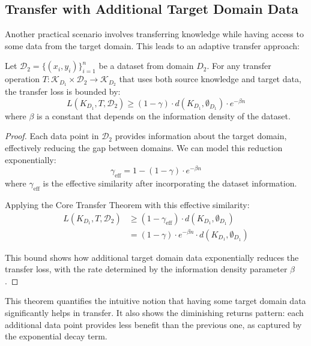 \subsection{Transfer with Additional Target Domain Data}

Another practical scenario involves transferring knowledge while having access to some data from the target domain. This leads to an adaptive transfer approach:

\begin{theorem}
Let $\mathcal{D}_2 = \{(x_i, y_i)\}_{i=1}^n$ be a dataset from domain $D_2$. For any transfer operation $T: \mathcal{K}_{D_1} \times \mathcal{D}_2 \to \mathcal{K}_{D_2}$ that uses both source knowledge and target data, the transfer loss is bounded by:
\begin{equation}
L(K_{D_1}, T, \mathcal{D}_2) \geq (1 - \gamma) \cdot d(K_{D_1}, \emptyset_{D_1}) \cdot e^{-\beta n}
\end{equation}
where $\beta$ is a constant that depends on the information density of the dataset.
\end{theorem}

\begin{proof}
Each data point in $\mathcal{D}_2$ provides information about the target domain, effectively reducing the gap between domains. We can model this reduction exponentially:
\begin{equation}
\gamma_{\text{eff}} = 1 - (1 - \gamma) \cdot e^{-\beta n}
\end{equation}
where $\gamma_{\text{eff}}$ is the effective similarity after incorporating the dataset information.

Applying the Core Transfer Theorem with this effective similarity:
\begin{align}
L(K_{D_1}, T, \mathcal{D}_2) &\geq (1 - \gamma_{\text{eff}}) \cdot d(K_{D_1}, \emptyset_{D_1}) \\
&= (1 - \gamma) \cdot e^{-\beta n} \cdot d(K_{D_1}, \emptyset_{D_1})
\end{align}

This bound shows how additional target domain data exponentially reduces the transfer loss, with the rate determined by the information density parameter $\beta$.
\end{proof}

This theorem quantifies the intuitive notion that having some target domain data significantly helps in transfer. It also shows the diminishing returns pattern: each additional data point provides less benefit than the previous one, as captured by the exponential decay term.

